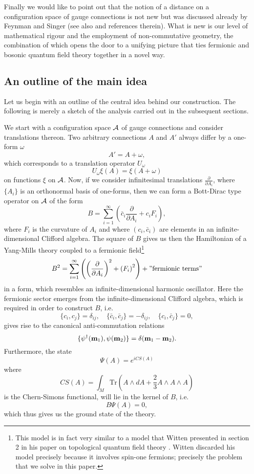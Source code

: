 \documentclass[letterpaper,11pt]{article}
\def\d{\delta}
\def\ca{{\cal A}}
\newcommand{\pa}{\partial}
\begin{document}
Finally we would like to point out that the notion of a distance on a configuration space of gauge connections is not new but
was discussed already by Feynman \cite{Feynman:1981ss} and Singer \cite{Singer:1981xw} (see also \cite{Orland:1996hm} and references therein). What is new is our level of mathematical rigour and the employment of non-commutative geometry, the combination of which opens the door to a unifying picture that ties fermionic and bosonic quantum field theory together in a novel way.








\subsection{An outline of the main idea}


Let us begin with an outline of the central idea behind our construction. The following is merely a sketch of the analysis carried out in the subsequent sections.

We start with a configuration space $\ca$ of gauge connections and consider translations thereon. Two arbitrary connections $A$ and $A'$ always differ by a one-form $\omega$
$$
A' = A+\omega,
$$
which corresponds to a translation operator $U_\omega$
$$
U_\omega \xi(A) = \xi(A+\omega)
$$
on functions $\xi$ on $\ca$. 
Now, if we consider infinitesimal translations $\frac{\pa}{\pa A_i}$, where $\{A_i\}$ is an orthonormal basis of one-forms, then we can form a Bott-Dirac type operator on $\ca$ of the form 
$$
B= \sum_{i=1}^\infty \left( \bar{c}_i \frac{\pa}{\pa A_i} + {c}_i F_i \right),
$$
where $F_i$ is the curvature of $A_i$ and where $(c_i,\bar{c}_i)$ are elements in an infinite-dimensional Clifford algebra. The square of $B$ gives us then the Hamiltonian of a Yang-Mills theory coupled to a fermionic field\footnote{This model is in fact very similar to a model that Witten presented in section 2 in his paper on topological quantum field theory \cite{Witten:1988ze}. Witten discarded his model precisely because it involves spin-one fermions; precisely the problem that we solve in this paper. }
$$
B^2 = \sum_{i=1}^\infty \left( \left(\frac{\pa}{\pa A_i}\right)^2 +  \left( F_i\right)^2 \right) + "\mbox{fermionic terms}"
$$
in a form, which resembles an infinite-dimensional harmonic oscillator. Here the fermionic sector emerges from the infinite-dimensional Clifford algebra, which is required in order to construct $B$, i.e.
$$
\{ c_i , {c}_j \} = \d_{ij},\quad \{ \bar{c}_i , \bar{c}_j \} = -\d_{ij},\quad \{ c_i , \bar{c}_j \} = 0,
$$
gives rise to the canonical anti-commutation relations
$$
\{  {\psi}^\dagger({\bf m}_1) , {\psi}({\bf m}_2) \} = \d({\bf m}_1-{\bf m}_2).
$$
Furthermore, the state
$$
\Psi(A) = e^{i CS(A)}
$$
where
$$
CS(A) = \int_M \mbox{Tr} \left( A\wedge dA + \frac{2}{3} A\wedge A \wedge A \right)
$$
is the Chern-Simons functional, will lie in the kernel of $B$, i.e.
$$
B \Psi(A) =0,
$$
which thus gives us the ground state of the theory.
\end{document}
